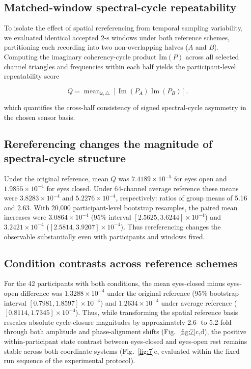 \documentclass[aps,pre,reprint,amsmath,amssymb,superscriptaddress]{revtex4-2}
\begin{document}
\subsection{Matched-window spectral-cycle repeatability}

To isolate the effect of spatial rereferencing from temporal sampling variability, we evaluated identical accepted $2\text{-s}$ windows under both reference schemes, partitioning each recording into two non-overlapping halves ($A$ and $B$). Computing the imaginary coherency-cycle product $\mathrm{Im}(P)$ across all selected channel triangles and frequencies within each half yields the participant-level repeatability score

\begin{equation}\label{eq:33}
\boxed{
Q=
\operatorname{mean}_{\omega,\triangle}
\left[
\operatorname{Im}(P_A)
\operatorname{Im}(P_B)
\right].
}
\end{equation}



which quantifies the cross-half consistency of signed spectral-cycle asymmetry in the chosen sensor basis.

\subsection{Rereferencing changes the magnitude of spectral-cycle structure}
Under the original reference, mean $Q$ was $7.4189\times10^{-5}$ for eyes open and $1.9855\times10^{-4}$ for eyes closed. Under 64-channel average reference these means were $3.8283\times10^{-4}$ and $5.2276\times10^{-4}$, respectively: ratios of group means of 5.16 and 2.63. With 20,000 participant-level bootstrap resamples, the paired mean increases were $3.0864\times10^{-4}$ (95\% interval $[2.5625,3.6244]\times10^{-4}$) and $3.2421\times10^{-4}$ ($[2.5814,3.9207]\times10^{-4}$). Thus rereferencing changes the observable substantially even with participants and windows fixed.

\subsection{Condition contrasts across reference schemes}
For the 42 participants with both conditions, the mean eyes-closed minus eyes-open difference was $1.3288\times10^{-4}$ under the original reference (95\% bootstrap interval $[0.7981,1.8597]\times10^{-4}$) and $1.2634\times10^{-4}$ under average reference ($[0.8114,1.7345]\times10^{-4}$). Thus, while transforming the spatial reference basis rescales absolute cycle-closure magnitudes by approximately 2.6- to 5.2-fold through both amplitude and phase-alignment shifts (Fig.~\ref{fig:7}c,d), the positive within-participant state contrast between eyes-closed and eyes-open rest remains stable across both coordinate systems (Fig.~\ref{fig:7}e, evaluated within the fixed run sequence of the experimental protocol).
\end{document}
